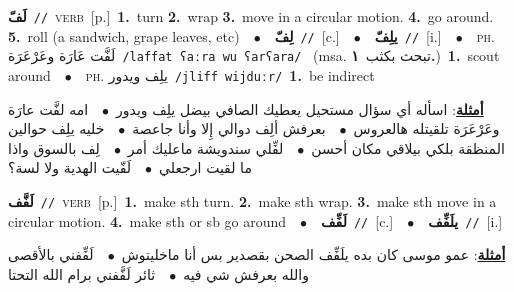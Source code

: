 \documentclass[10pt,a4paper,twoside]{article} %
\begin{document}
\begin{multicols}{2}
{\setlength\topsep{0pt}\textbf{\foreignlanguage{arabic}{لَفّ}}\ {\color{gray}\texttt{//}\color{black}}\ \textsc{verb}\ [p.]\ \textbf{1.}~turn  \textbf{2.}~wrap  \textbf{3.}~move in a circular motion.  \textbf{4.}~go around.  \textbf{5.}~roll (a sandwich, grape leaves, etc)\ \ $\bullet$\ \ \setlength\topsep{0pt}\textbf{\foreignlanguage{arabic}{لِفّ}}\ {\color{gray}\texttt{//}\color{black}}\ [c.]\ \ $\bullet$\ \ \setlength\topsep{0pt}\textbf{\foreignlanguage{arabic}{يلِفّ}}\ {\color{gray}\texttt{//}\color{black}}\ [i.]\ \ $\bullet$\ \ \textsc{ph.} \color{gray} \foreignlanguage{arabic}{لَفَّت عَارَة وعَرْعَرَة}\color{black}\ {\color{gray}\texttt{/{\sffamily laffat ʕaːra wu ʕarʕara}/}\color{black}}\ \color{gray} (msa. \foreignlanguage{arabic}{تبحث بكثب}~\foreignlanguage{arabic}{\textbf{١.}})\color{black}\ \textbf{1.}~scout around\ \ $\bullet$\ \ \textsc{ph.} \color{gray} \foreignlanguage{arabic}{يلِف ويدور}\color{black}\ {\color{gray}\texttt{/{\sffamily jliff wijduːr}/}\color{black}}\ \textbf{1.}~be indirect\  \begin{flushright}\color{gray}\foreignlanguage{arabic}{\textbf{\underline{\foreignlanguage{arabic}{أمثلة}}}: اسأله أي سؤال مستحيل يعطيك الصافي بيضل يلِف ويدور\ $\bullet$\ \  امه لفَّت عارَة وعَرْعَرَة تلقيتله هالعروس\ $\bullet$\ \  بعرفش ألِف دوالي إِلا وأنا جاعصة\ $\bullet$\ \  خليه يلِف حوالين المنظقة بلكي بيلاقي مكان أحسن\ $\bullet$\ \  لفِّلي سندويشة ماعليك أمر\ $\bullet$\ \  لِف بالسوق واذا ما لقيت ارجعلي\ $\bullet$\ \  لَفّيت الهدية ولا لسة؟}\end{flushright}\color{black}} \vspace{2mm}

{\setlength\topsep{0pt}\textbf{\foreignlanguage{arabic}{لَفَّف}}\ {\color{gray}\texttt{//}\color{black}}\ \textsc{verb}\ [p.]\ \textbf{1.}~make sth turn.  \textbf{2.}~make sth wrap.  \textbf{3.}~make sth move in a circular motion.  \textbf{4.}~make sth or sb go around\ \ $\bullet$\ \ \setlength\topsep{0pt}\textbf{\foreignlanguage{arabic}{لَفِّف}}\ {\color{gray}\texttt{//}\color{black}}\ [c.]\ \ $\bullet$\ \ \setlength\topsep{0pt}\textbf{\foreignlanguage{arabic}{يلَفِّف}}\ {\color{gray}\texttt{//}\color{black}}\ [i.]\  \begin{flushright}\color{gray}\foreignlanguage{arabic}{\textbf{\underline{\foreignlanguage{arabic}{أمثلة}}}: عمو موسى كان بده يلَفِّف الصحن بقصدير بس أنا ماخليتوش\ $\bullet$\ \  لَفِّفني بالأقصى والله بعرفش شي فيه\ $\bullet$\ \  ثائر لَفَّفني برام الله التحتا}\end{flushright}\color{black}} \vspace{2mm}


\end{multicols}
\end{document}
